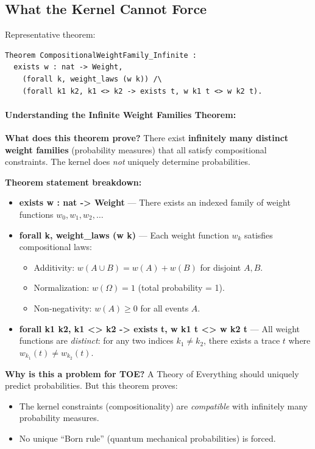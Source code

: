 \subsection{What the Kernel Cannot Force}

Representative theorem:
\begin{lstlisting}
Theorem CompositionalWeightFamily_Infinite :
  exists w : nat -> Weight,
    (forall k, weight_laws (w k)) /\
    (forall k1 k2, k1 <> k2 -> exists t, w k1 t <> w k2 t).
\end{lstlisting}

\paragraph{Understanding the Infinite Weight Families Theorem:}

\textbf{What does this theorem prove?} There exist \textbf{infinitely many distinct weight families} (probability measures) that all satisfy compositional constraints. The kernel does \textit{not} uniquely determine probabilities.

\textbf{Theorem statement breakdown:}
\begin{itemize}
    \item \textbf{exists w : nat -> Weight} — There exists an indexed family of weight functions $w_0, w_1, w_2, \ldots$
    
    \item \textbf{forall k, weight\_laws (w k)} — Each weight function $w_k$ satisfies compositional laws:
    \begin{itemize}
        \item Additivity: $w(A \cup B) = w(A) + w(B)$ for disjoint $A, B$.
        \item Normalization: $w(\Omega) = 1$ (total probability = 1).
        \item Non-negativity: $w(A) \geq 0$ for all events $A$.
    \end{itemize}
    
    \item \textbf{forall k1 k2, k1 <> k2 -> exists t, w k1 t <> w k2 t} — All weight functions are \textit{distinct}: for any two indices $k_1 \neq k_2$, there exists a trace $t$ where $w_{k_1}(t) \neq w_{k_2}(t)$.
\end{itemize}

\textbf{Why is this a problem for TOE?} A Theory of Everything should uniquely predict probabilities. But this theorem proves:
\begin{itemize}
    \item The kernel constraints (compositionality) are \textit{compatible} with infinitely many probability measures.
    \item No unique ``Born rule'' (quantum mechanical probabilities) is forced.
\end{itemize}

